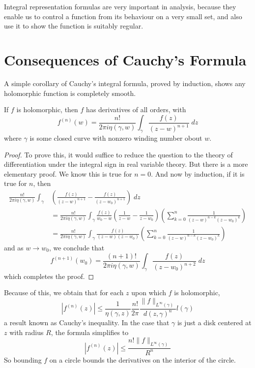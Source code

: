 \begin{remark}
Integral representation formulas are very important in analysis, because they enable us to control a function from its behaviour on a very small set, and also use it to show the function is suitably regular.
\end{remark}

\section{Consequences of Cauchy's Formula}

A simple corollary of Cauchy's integral formula, proved by induction, shows any holomorphic function is completely smooth.

\begin{theorem}
    If $f$ is holomorphic, then $f$ has derivatives of all orders, with
    \[ f^{(n)}(w) = \frac{n!}{2 \pi i \eta(\gamma,w)} \int_\gamma \frac{f(z)}{(z - w)^{n+1}}\; dz \]
    where $\gamma$ is some closed curve with nonzero winding number obout $w$.
\end{theorem}
\begin{proof}
    To prove this, it would suffice to reduce the question to the theory of differentiation under the integral sign in real variable theory. But there is a more elementary proof. We know this is true for $n = 0$. And now by induction, if it is true for $n$, then
    \begin{align*}
        \frac{n!}{2 \pi i \eta(\gamma,w)} \int_\gamma & \left( \frac{f(z)}{(z - w)^{n+1}} - \frac{f(z)}{(z - w_0)^{n+1}} \right)\; dz\\
        &= \frac{n!}{2 \pi i \eta(\gamma,w)} \int_\gamma \frac{f(z)}{w_0 - w} \left( \frac{1}{z - w} - \frac{1}{z - w_0} \right) \left( \sum_{k = 0}^n \frac{1}{(z - w)^{n-k}(z - w_0)^k} \right)\\
        &= \frac{n!}{2 \pi i \eta(\gamma,w)} \int_\gamma \frac{f(z)}{(z - w)(z - w_0)} \left( \sum_{k = 0}^n \frac{1}{(z - w)^{n-k}(z - w_0)^k} \right)
    \end{align*}
    and as $w \to w_0$, we conclude that
    \[ f^{(n+1)}(w_0) = \frac{(n+1)!}{2 \pi i \eta(\gamma,w)} \int_\gamma \frac{f(z)}{(z - w_0)^{n+2}}\; dz \]
    which completes the proof.
\end{proof}

\begin{remark}
    Because of this, we obtain that for each $z$ upon which $f$ is holomorphic,
    \[ | f^{(n)}(z) | \leq \frac{1}{\eta(\gamma,z)} \frac{n!}{2\pi} \frac{\| f \|_{L^\infty(\gamma)}}{d(z,\gamma)^n} l(\gamma) \]
    a result known as Cauchy's inequality. In the case that $\gamma$ is just a disk centered at $z$ with radius $R$, the formula simplifies to
    \[ | f^{(n)}(z) | \leq \frac{n! \| f \|_{L^\infty(\gamma)}}{R^n} \]
    So bounding $f$ on a circle bounds the derivatives on the interior of the circle.
\end{remark}


